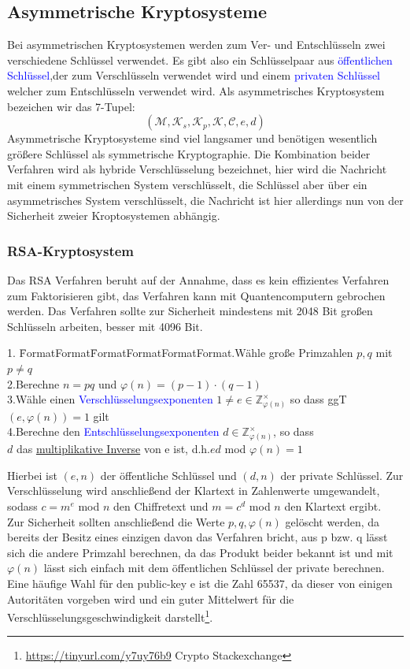 \documentclass[a4paper,12pt,leqno]{article}
\newcommand{\blue}[1]{\textcolor{blue}{#1}}
\begin{document}
\subsection{Asymmetrische Kryptosysteme}
Bei asymmetrischen Kryptosystemen werden zum Ver- und Entschlüsseln zwei verschiedene Schlüssel verwendet. Es gibt also ein Schlüsselpaar aus \blue{öffentlichen Schlüssel},der zum Verschlüsseln verwendet wird und einem \blue{privaten Schlüssel} welcher zum Entschlüsseln verwendet wird.
Als asymmetrisches Kryptosystem bezeichen wir das 7-Tupel: $$(\mathcal{M},\mathcal{K}_s, \mathcal{K}_p,\mathcal{K},\mathcal{C},e,d)$$
Asymmetrische Kryptosysteme sind viel langsamer und benötigen wesentlich größere Schlüssel als symmetrische Kryptographie. Die Kombination beider Verfahren wird als hybride Verschlüsselung bezeichnet, hier wird die Nachricht mit einem symmetrischen System verschlüsselt, die Schlüssel aber über ein asymmetrisches System verschlüsselt, die Nachricht ist hier allerdings nun von der Sicherheit zweier Kroptosystemen abhängig.
\subsubsection{RSA-Kryptosystem}
Das RSA Verfahren beruht auf der Annahme, dass es kein effizientes Verfahren zum Faktorisieren gibt, das Verfahren kann mit Quantencomputern gebrochen werden.
Das Verfahren sollte zur Sicherheit mindestens mit 2048 Bit großen Schlüsseln arbeiten, besser mit 4096 Bit.
\begin{tabbing}
1. \= FormatFormat\= FormatFormatFormatFormat.\>Wähle große Primzahlen $p,q$ mit $p\neq q$\\
2.\>Berechne $n=pq$ und $\varphi(n)=(p-1)\cdot(q-1)$\\
3.\>Wähle einen \blue{Verschlüsselungsexponenten} $1\neq e\in \mathbb{Z}_{\varphi(n)}^\times$ so dass ggT$(e,\varphi(n))=1$ gilt\\
4.\>Berechne den \blue{Entschlüsselungsexponenten} $d\in\mathbb{Z}_{\varphi(n)}^\times$, so dass \\
\>\>$d$ das \hyperref[sec:euklid]{multiplikative Inverse} von e ist, d.h.$ed$ mod $\varphi(n)=1$
\end{tabbing}
Hierbei ist $(e,n)$ der öffentliche Schlüssel und $(d,n)$ der private Schlüssel.
Zur Verschlüsselung wird anschließend der Klartext in Zahlenwerte umgewandelt, sodass $c=m^e$ mod $n$ den Chiffretext und $m = c^d$ mod $n$ den Klartext ergibt.\\
Zur Sicherheit sollten anschließend die Werte $p,q,\varphi(n)$ gelöscht werden, da bereits der Besitz eines einzigen davon das Verfahren bricht, aus p bzw. q lässt sich die andere Primzahl berechnen, da das Produkt beider bekannt ist und mit $\varphi(n)$ lässt sich einfach mit dem öffentlichen Schlüssel der private berechnen.\\ Eine häufige Wahl für den public-key e ist die Zahl 65537, da dieser von einigen Autoritäten vorgeben wird und ein guter Mittelwert für die Verschlüsselungsgeschwindigkeit darstellt\footnote{\url{https://tinyurl.com/y7uy76b9} Crypto Stackexchange}.
\end{document}
